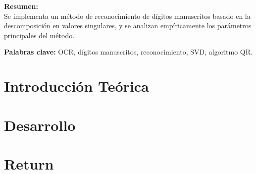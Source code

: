 \documentclass[a4paper,10pt,twoside]{article}
\begin{document}
\vspace{3cm}

\textbf{Resumen:} \\
Se implementa un método de reconocimiento de dígitos manuscritos basado en la descomposición en valores singulares, y se analizan empíricamente los parámetros principales del método.

\textbf{Palabras clave:}
OCR, dígitos manuscritos, reconocimiento, SVD, algoritmo QR.

\newpage




\tableofcontents

\newpage




\section{Introducción Teórica}




\section{Desarrollo}




\section{Return}


\end{document}
